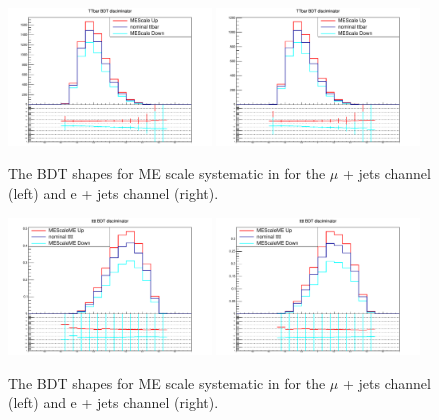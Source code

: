 \begin{figure}[ht!]
    \includegraphics[width=0.48\textwidth]{images/Run2/Sys/MEScalesystt.pdf}
    \includegraphics[width=0.48\textwidth]{images/Run2/Sys/MEScalesystt_e.pdf}     
    \caption{The BDT shapes for ME scale systematic in \ttbar for the $\mu$ + jets channel (left) and e + jets channel (right).}
    \label{fig:SysShapesMEtt}
\end{figure}
\begin{figure}[ht!]
    \includegraphics[width=0.48\textwidth]{images/Run2/Sys/MEScalesystttt.pdf}
    \includegraphics[width=0.48\textwidth]{images/Run2/Sys/MEScalesystttt_e.pdf}     
    \caption{The BDT shapes for ME scale systematic in \tttt for the $\mu$ + jets channel (left) and e + jets channel (right).}
    \label{fig:SysShapesMEtttt}
\end{figure}

